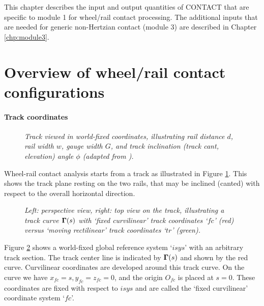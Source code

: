 \documentclass[12pt]{report}
\begin{document}
This chapter describes the input and output quantities of CONTACT that are
specific to module 1 for wheel/rail contact processing. The additional
inputs that are needed for generic non-Hertzian contact (module 3) are
described in Chapter \ref{chp:module3}.

\section{Overview of wheel/rail contact configurations}
\label{sec:wr_coords}

\paragraph{Track coordinates}

\begin{figure}[bt]
\centering
{}
\caption{\em Track viewed in world-fixed coordinates, illustrating rail
distance $d$, rail width $w$, gauge width $G$, and track inclination
(track cant, elevation) angle $\phi$ (adapted from \cite{Shabana2008}).}
\label{fig:world_coords}
\end{figure}

Wheel-rail contact analysis starts from a track as illustrated in Figure
\ref{fig:world_coords}. This shows the track plane resting on the two
rails, that may be inclined (canted) with respect to the overall horizontal
direction. 

\begin{figure}[bt]
\centering
{}
\caption{\em Left: perspective view, right: top view on the track,
        illustrating a track curve $\boldsymbol{\Gamma}(s)$ with `fixed curvilinear'
        track coordinates `$fc$' (red) versus `moving rectilinear' track
        coordinates `$tr$' (green).}
\label{fig:fc_coords}
\end{figure}

Figure \ref{fig:fc_coords} shows a world-fixed global reference system
`$isys$' with an arbitrary track section. The track center line is indicated by
$\boldsymbol{\Gamma}(s)$ and shown by the red curve. Curvilinear coordinates are
developed around this track curve. On the curve we have $x_{fc}=s, 
y_{fc}=z_{fc}=0$, and the origin $O_{fc}$ is placed at $s=0$. These
coordinates are fixed with respect to $isys$ and are called the
`fixed curvilinear' coordinate system `$fc$'.
\end{document}

